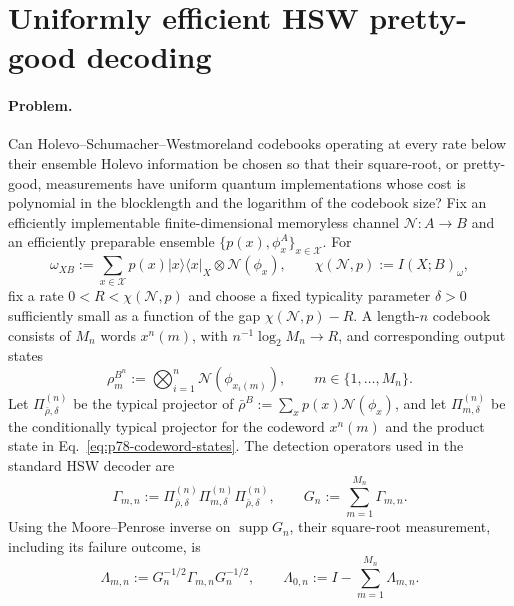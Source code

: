 \section{Uniformly efficient HSW pretty-good decoding}
\label{sec:problem-78}

\paragraph{Problem.}
Can Holevo--Schumacher--Westmoreland codebooks operating at every rate below
their ensemble Holevo information be chosen so that their square-root, or
pretty-good, measurements have uniform quantum
implementations whose cost is polynomial in the blocklength and the logarithm
of the codebook size?  Fix an efficiently implementable finite-dimensional
memoryless channel $\mathcal N:A\to B$ and an efficiently preparable ensemble
$\{p(x),\phi_x^A\}_{x\in\mathcal X}$.  For
\begin{equation}
  \omega_{XB}:=\sum_{x\in\mathcal X}p(x)|x\rangle\!\langle x|_X
    \otimes\mathcal N(\phi_x),
  \qquad
  \chi(\mathcal N,p):=I(X;B)_\omega,
  \label{eq:p78-holevo-information}
\end{equation}
fix a rate $0<R<\chi(\mathcal N,p)$ and choose a fixed typicality parameter
$\delta>0$ sufficiently small as a function of the gap
$\chi(\mathcal N,p)-R$.  A length-$n$ codebook consists of
$M_n$ words $x^n(m)$, with $n^{-1}\log_2M_n\to R$, and corresponding output
states
\begin{equation}
  \rho_m^{B^n}:=\bigotimes_{i=1}^{n}\mathcal N(\phi_{x_i(m)}),
  \qquad m\in\{1,\ldots,M_n\}.
  \label{eq:p78-codeword-states}
\end{equation}
Let $\Pi_{\bar\rho,\delta}^{(n)}$ be the typical projector of
$\bar\rho^B:=\sum_x p(x)\mathcal N(\phi_x)$, and let
$\Pi_{m,\delta}^{(n)}$ be the conditionally typical projector for the
codeword $x^n(m)$ and the product state in
Eq.~\eqref{eq:p78-codeword-states}.  The detection operators used in the
standard HSW decoder are
\begin{equation}
  \Gamma_{m,n}
  :=\Pi_{\bar\rho,\delta}^{(n)}
      \Pi_{m,\delta}^{(n)}
      \Pi_{\bar\rho,\delta}^{(n)},
  \qquad
  G_n:=\sum_{m=1}^{M_n}\Gamma_{m,n}.
  \label{eq:p78-hsw-detection-operators}
\end{equation}
Using the Moore--Penrose inverse on $\operatorname{supp}G_n$, their
square-root measurement, including its failure outcome, is
\begin{equation}
  \Lambda_{m,n}:=G_n^{-1/2}\Gamma_{m,n}G_n^{-1/2},
  \qquad
  \Lambda_{0,n}:=I-\sum_{m=1}^{M_n}\Lambda_{m,n}.
  \label{eq:p78-hsw-pgm}
\end{equation}


